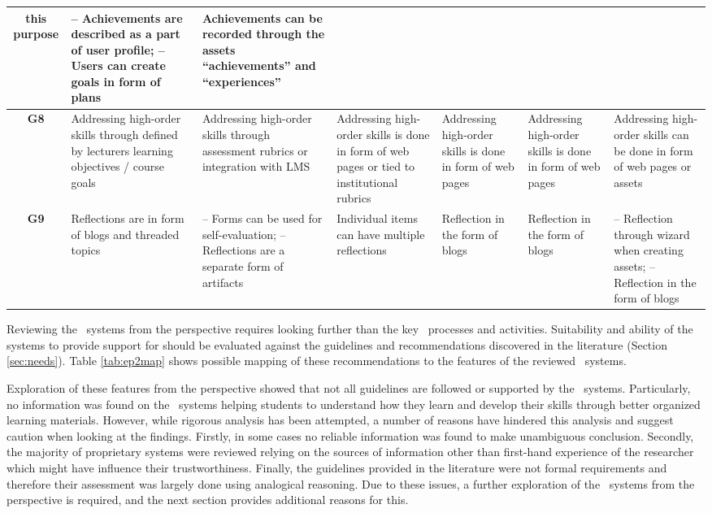 \begin{sidewaystable}
\begin{tabular}{|c|p{3.25cm}|p{3.25cm}|p{3.25cm}|p{3.25cm}|p{3.25cm}|p{3.25cm}|}
	this purpose & 
	-- Achievements are described as a part of user profile; \newline -- Users can
	create goals in form of plans & 
	Achievements can be recorded through the assets ``achievements''
	and ``experiences''	\\ \hline 
	\textbf{G8} & 
	Addressing high-order skills through defined by lecturers learning
	objectives / course goals & 
	Addressing high-order skills through assessment rubrics or integration with LMS
	& 
	Addressing high-order skills is done in form of web pages or tied to
	institutional rubrics & 
	Addressing high-order skills is done in form of web pages & 
	Addressing high-order skills is done in form of web pages & 
	Addressing high-order skills can be done in form of web pages or assets \\
	\hline 
	\textbf{G9} & 
	Reflections are in form of blogs and threaded topics & 
	-- Forms can be used for self-evaluation; \newline -- Reflections are a
	separate form of artifacts & 
	Individual items can have multiple reflections & 
	Reflection in the form of blogs & 
	Reflection in the form of blogs & 
	-- Reflection through wizard when creating assets; \newline -- Reflection in
	the form of blogs \\ \hline
	\end{tabular}
\label{tab:ep2map} 
\end{sidewaystable} 

Reviewing the \ep~systems from the \LLLs perspective requires looking further
than the key \ep~processes and activities. Suitability and ability of the
systems to provide support for \LLLs should be evaluated against the guidelines
and recommendations discovered in the literature (Section \ref{sec:needs}). Table
\ref{tab:ep2map} shows possible mapping of these recommendations to the features
of the reviewed \ep~systems. 

Exploration of these features from the \LLLs perspective showed that not all
guidelines are followed or supported by the \ep~systems. Particularly, no
information was found on the \ep~systems helping students to understand how they
learn and develop their skills through better organized learning materials.
However, while rigorous analysis has been attempted, a number of reasons have
hindered this analysis and suggest caution when looking at the findings.
Firstly, in some cases no reliable information was found to make unambiguous
conclusion. Secondly, the majority of proprietary systems were reviewed relying
on the sources of information other than first-hand experience of the researcher
which might have influence their trustworthiness. Finally, the guidelines
provided in the literature were not formal requirements and therefore their
assessment was largely done using analogical reasoning. Due to these issues, a
further exploration of the \ep~systems from the \LLLs perspective is required,
and the next section provides additional reasons for this.

